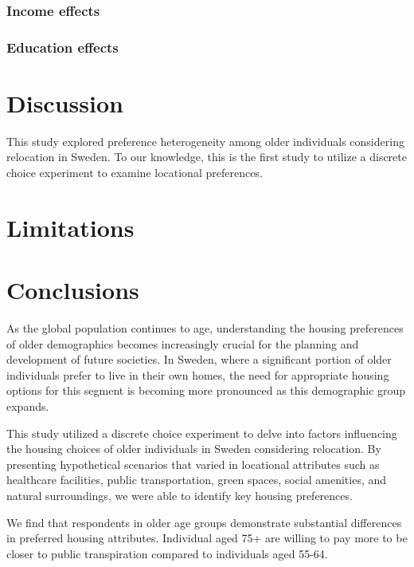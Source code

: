 \documentclass[3p,11pt ]{elsarticle}
\begin{document}
\subsubsection{Income effects}

\subsubsection{Education effects}




\section{Discussion}

This study explored preference heterogeneity among older individuals considering relocation in Sweden.
To our knowledge, 
this is the first study to utilize a discrete choice experiment to examine locational preferences.

\section{Limitations}



\section{Conclusions}

As the global population continues to age, understanding the housing preferences of older demographics becomes increasingly crucial for the planning and development of future societies.
In Sweden, where a significant portion of older individuals prefer to live in their own homes, the need for appropriate housing options for this segment is becoming more pronounced as this demographic group expands. 

This study utilized a discrete choice experiment to delve into factors influencing the housing choices of older individuals in Sweden considering relocation.
By presenting hypothetical scenarios that varied in locational attributes such as healthcare facilities, public transportation, green spaces, social amenities, and natural surroundings, we were able to identify key housing preferences.

We find that respondents in older age groups demonstrate substantial differences in preferred housing attributes.
Individual aged 75+ are willing to pay more to be closer to public transpiration compared to individuals aged 55-64.
\end{document}
